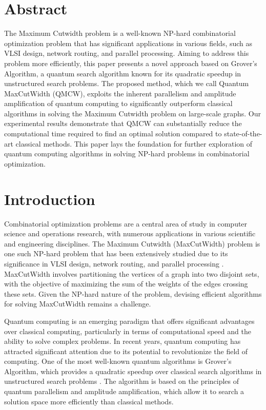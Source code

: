 \section{Abstract}

The Maximum Cutwidth problem is a well-known NP-hard combinatorial optimization problem that has significant applications in various fields, such as VLSI design, network routing, and parallel processing. Aiming to address this problem more efficiently, this paper presents a novel approach based on Grover's Algorithm, a quantum search algorithm known for its quadratic speedup in unstructured search problems. The proposed method, which we call Quantum MaxCutWidth (QMCW), exploits the inherent parallelism and amplitude amplification of quantum computing to significantly outperform classical algorithms in solving the Maximum Cutwidth problem on large-scale graphs. Our experimental results demonstrate that QMCW can substantially reduce the computational time required to find an optimal solution compared to state-of-the-art classical methods. This paper lays the foundation for further exploration of quantum computing algorithms in solving NP-hard problems in combinatorial optimization.

\section{Introduction}

Combinatorial optimization problems are a central area of study in computer science and operations research, with numerous applications in various scientific and engineering disciplines. The Maximum Cutwidth (MaxCutWidth) problem is one such NP-hard problem that has been extensively studied due to its significance in VLSI design, network routing, and parallel processing \cite{maxcutwidth_application}. MaxCutWidth involves partitioning the vertices of a graph into two disjoint sets, with the objective of maximizing the sum of the weights of the edges crossing these sets. Given the NP-hard nature of the problem, devising efficient algorithms for solving MaxCutWidth remains a challenge.

Quantum computing is an emerging paradigm that offers significant advantages over classical computing, particularly in terms of computational speed and the ability to solve complex problems. In recent years, quantum computing has attracted significant attention due to its potential to revolutionize the field of computing. One of the most well-known quantum algorithms is Grover's Algorithm, which provides a quadratic speedup over classical search algorithms in unstructured search problems \cite{grover}. The algorithm is based on the principles of quantum parallelism and amplitude amplification, which allow it to search a solution space more efficiently than classical methods.

